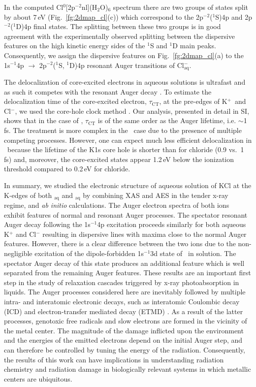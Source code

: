 In the computed Cl$^{0}$[2p$^{-2}$nl](H$_2$O)$_6$ spectrum there are two groups of states split by about 7\,eV (Fig.\ \ref{fg:2dmap_cl}(c)) which correspond to the 2p$^{-2}$($^1$S)4p and 2p$^{-2}$($^1$D)4p final states. The splitting between these two groups is in good agreement with the experimentally observed splitting between the dispersive features on the high kinetic energy sides of the $^1$S and $^1$D main peaks. Consequently, we assign the dispersive features on Fig.\ \ref{fg:2dmap_cl}(a) to the 1s$^{-1}$4p $\rightarrow$ 2p$^{-2}$($^1$S, $^1$D)4p resonant Auger transitions of Cl$^{-}_{\text{aq}}$.


The delocalization of core-excited electrons in aqueous solutions is ultrafast and as such it competes with the resonant Auger decay \citep{Nordlund07:217406,ottosson12:1}. To estimate the delocalization time of the core-excited electron, $\tau_{\text{CT}}$, at the pre-edges of K$^{+}$~and Cl$^{-}$, we used the core-hole clock method \cite{bjorneholm92:1892,karis96:1380,wurth00:141,bruehwiler02:703,foehlisch05:373}. Our analysis, presented in detail in SI, shows that in the case of \cli, $\tau_{\text{CT}}$ is of the same order as the Auger lifetime, i.e. $\sim$1\,fs. The treatment is more complex in the \ki~case due to the presence of multiple competing processes. However, one can expect much less efficient delocalization in \ki~because the lifetime of the K1s core hole is shorter than for chloride (0.9 vs.\ 1\,fs) and, moreover, the core-excited states appear 1.2\,eV below the ionization threshold compared to 0.2\,eV for chloride.


In summary, we studied the electronic structure of aqueous solution of KCl at the K-edges of both \ki$_{\text{aq}}$ and \cli$_{\text{aq}}$ by combining XAS and AES in the tender x-ray regime, and {\it ab initio} calculations. The Auger electron spectra of both ions exhibit features of normal and resonant Auger processes. The spectator resonant Auger decay following the 1s$^{-1}$4p excitation proceeds similarly for both aqueous K$^{+}$ and Cl$^{-}$ resulting in dispersive lines with maxima close to the normal Auger features. However, there is a clear difference between the two ions due to the non-negligible excitation of the dipole-forbidden 1s$^{-1}$3d state of \ki~in solution. The spectator Auger decay of this state produces an additional feature which is well separated from the remaining Auger features. These results are an important first step in the study of relaxation cascades triggered by x-ray photoabsorption in liquids. The Auger processes considered here are inevitably followed by multiple intra- and interatomic electronic decays, such as interatomic Coulombic decay (ICD) and electron-transfer mediated decay (ETMD) \citep{unger17:708,Stumpf16:237}. As a result of the latter processes, genotoxic free radicals and slow electrons are formed in the vicinity of the metal center. The magnitude of the damage inflicted upon the environment and the energies of the emitted electrons depend on the initial Auger step, and can therefore be controlled by tuning the energy of the radiation. Consequently, the results of this work can have implications in understanding radiation chemistry and radiation damage in biologically relevant systems in which metallic centers are ubiquitous.
